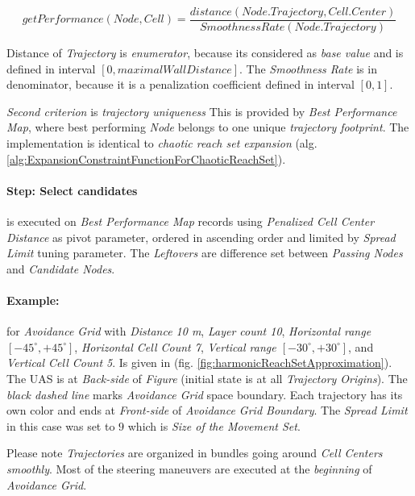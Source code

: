 \begin{equation}
    getPerformance(Node,Cell) = \frac{distance(Node.Trajectory,Cell.Center)}{SmoothnessRate(Node.Trajectory)}
\end{equation}

\noindent Distance of \emph{Trajectory} is \emph{enumerator}, because its considered as \emph{base value} and is defined in interval $[0,maximalWallDistance]$. The \emph{Smoothness Rate} is in denominator, because it is a penalization coefficient defined in interval $[0,1]$. 

\emph{Second criterion} is \emph{trajectory uniqueness} This is provided by \emph{Best Performance Map}, where best performing \emph{Node} belongs to one unique \emph{trajectory footprint}. The implementation is identical to \emph{chaotic reach set expansion} (alg. \ref{alg:ExpansionConstraintFunctionForChaoticReachSet}).

\paragraph{Step: Select candidates} is executed  on \emph{Best Performance Map} records using \emph{Penalized Cell Center Distance} as pivot parameter, ordered in ascending order and limited by \emph{Spread Limit} tuning parameter. The \emph{Leftovers} are difference set between \emph{Passing Nodes} and \emph{Candidate Nodes}.




\paragraph{Example:} for \emph{Avoidance Grid} with \emph{Distance 10 m}, \emph{Layer count 10}, \emph{Horizontal range $[-45^\circ,+45^\circ]$}, \emph{Horizontal Cell Count 7}, \emph{Vertical range $[-30^\circ,+30^\circ]$}, and \emph{Vertical Cell Count 5}. Is given in (fig. \ref{fig:harmonicReachSetApproximation}). The UAS is at \emph{Back-side} of \emph{Figure} (initial state is at all \emph{Trajectory Origins}). The \emph{black dashed line} marks \emph{Avoidance Grid} space boundary. Each trajectory has its own color and ends at \emph{Front-side} of \emph{Avoidance Grid Boundary}. The \emph{Spread Limit} in this case was set to $9$ which is \emph{Size of the Movement Set}.

\begin{note}
    Please note \emph{Trajectories} are organized in bundles going around \emph{Cell Centers smoothly}. Most of the steering maneuvers are executed at the \emph{beginning} of \emph{Avoidance Grid}.
\end{note}


